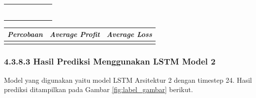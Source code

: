 \begin{table}[H]
\begin{tabular}{|c|c|l|l|l|l|l|}
                         &                       &               &  &                                         &                                      &               \\ \cline{1-3} \cline{5-7} 
  \multicolumn{1}{|l|}{} & \multicolumn{1}{l|}{} &               &  &                                         &                                      &               \\ \cline{1-3} \cline{5-7} 
  \multicolumn{1}{|l|}{} & \multicolumn{1}{l|}{} &               &  &                                         &                                      &               \\ \cline{1-3} \cline{5-7} 
  \multicolumn{1}{|l|}{} & \multicolumn{1}{l|}{} &               &  &                                         &                                      &               \\ \cline{1-3} \cline{5-7} 
  \multicolumn{1}{|l|}{} & \multicolumn{1}{l|}{} &               &  &                                         &                                      &               \\ \cline{1-3} \cline{5-7} 
  \multicolumn{1}{|l|}{} & \multicolumn{1}{l|}{} &               &  &                                         &                                      &               \\ \cline{1-3} \cline{5-7} 
  \end{tabular}
  \end{table}


\begin{table}[H]
  \centering
    \begin{tabular}{|c|c|l|}
    \hline
    \textit{Percobaan} & \textit{Average Profit} & \textit{Average Loss} \\ \hline
                       &                         &                       \\ \hline
    \end{tabular}
\end{table}

\subsubsection*{4.3.8.3 Hasil Prediksi Menggunakan LSTM Model 2}
Model yang digunakan yaitu model LSTM Arsitektur 2 dengan timestep 24. Hasil prediksi ditampilkan pada Gambar \ref{fig:label_gambar} berikut.


